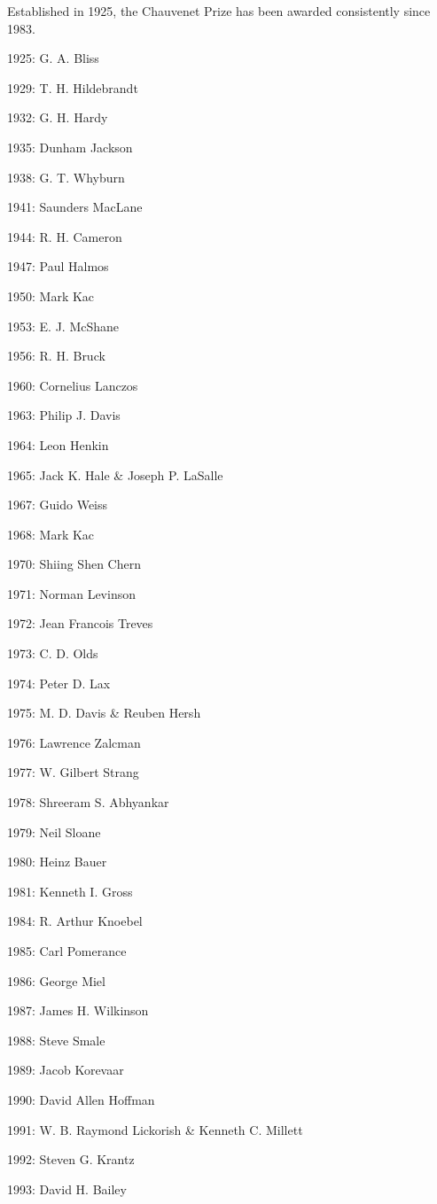 \documentclass[12pt]{article}
\begin{document}
Established in 1925, the Chauvenet Prize has been awarded consistently since 1983.

1925: G. A. Bliss 

1929: T. H. Hildebrandt 

1932: G. H. Hardy 

1935: Dunham Jackson 

1938: G. T. Whyburn 

1941: Saunders MacLane 

1944: R. H. Cameron 

1947: Paul Halmos 

1950: Mark Kac 

1953: E. J. McShane 

1956: R. H. Bruck 

1960: Cornelius Lanczos 

1963: Philip J. Davis 

1964: Leon Henkin 

1965: Jack K. Hale \& Joseph P. LaSalle 

1967: Guido Weiss 

1968: Mark Kac 

1970: Shiing Shen Chern 

1971: Norman Levinson 

1972: Jean Francois Treves 

1973: C. D. Olds 

1974: Peter D. Lax 

1975: M. D. Davis \& Reuben Hersh 

1976: Lawrence Zalcman 

1977: W. Gilbert Strang 

1978: Shreeram S. Abhyankar 

1979: Neil Sloane 

1980: Heinz Bauer 

1981: Kenneth I. Gross 

1984: R. Arthur Knoebel 

1985: Carl Pomerance 

1986: George Miel 

1987: James H. Wilkinson 

1988: Steve Smale 

1989: Jacob Korevaar 

1990: David Allen Hoffman 

1991: W. B. Raymond Lickorish \& Kenneth C. Millett 

1992: Steven G. Krantz 

1993: David H. Bailey 
\end{document}
